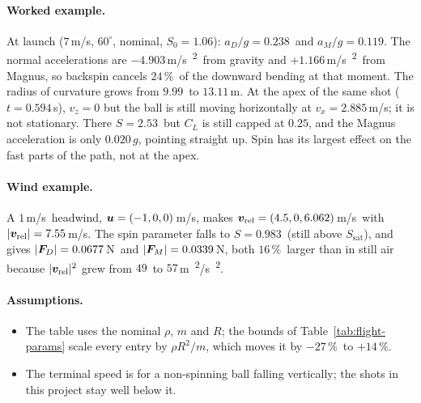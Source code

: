 \paragraph{Worked example.}
At launch ($7$\,\unit{m/s}\assumed, $60^\circ$\assumed, nominal, $S_0 = 1.06$\assumed):
$a_D/g = 0.238$\derived\ and $a_M/g = 0.119$\derived.
The normal accelerations are $-4.903$\,\unit{m/s\textsuperscript{2}}\derived\ from gravity and
$+1.166$\,\unit{m/s\textsuperscript{2}}\derived\ from Magnus, so backspin cancels $24$\,\%\derived\ of the downward
bending at that moment.
The radius of curvature grows from $9.99$\derived\ to $13.11$\,\unit{m}\derived.
At the apex of the same shot ($t = 0.594$\,\unit{s}\predicted), $v_z = 0$ but the ball is still moving
horizontally at $v_x = 2.885$\,\unit{m/s}\predicted; it is not stationary.
There $S = 2.53$\predicted\ but $C_L$ is still capped at $0.25$\derived, and the Magnus acceleration is only
$0.020\,g$\predicted, pointing straight up.
Spin has its largest effect on the fast parts of the path, not at the apex.

\paragraph{Wind example.}
A $1$\,\unit{m/s}\assumed\ headwind, $\bm{u} = (-1, 0, 0)$\,\unit{m/s}\assumed, makes
$\bm{v}_{\mathrm{rel}} = (4.5, 0, 6.062)$\,\unit{m/s}\derived\ with $|\bm{v}_{\mathrm{rel}}| = 7.55$\,\unit{m/s}\derived.
The spin parameter falls to $S = 0.983$\derived\ (still above $S_{\mathrm{sat}}$), and
 gives $|\bm{F}_D| = 0.0677$\,\unit{N}\predicted\ and
$|\bm{F}_M| = 0.0339$\,\unit{N}\predicted, both $16$\,\%\derived\ larger than in still air because
$|\bm{v}_{\mathrm{rel}}|^2$ grew from $49$\derived\ to $57$\,\unit{m\textsuperscript{2}/s\textsuperscript{2}}\derived.

\paragraph{Assumptions.}
\begin{itemize}
  \item The table uses the nominal $\rho$, $m$ and $R$; the bounds of Table~\ref{tab:flight-params}
    scale every entry by $\rho R^2/m$, which moves it by $-27$\,\%\derived\ to $+14$\,\%\derived.
  \item The terminal speed is for a non-spinning ball falling vertically; the shots in this project
    stay well below it.
\end{itemize}

